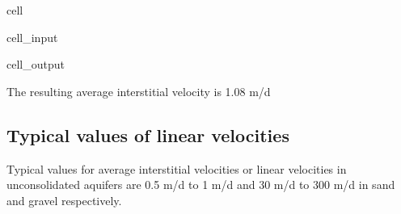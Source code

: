 \documentclass[letterpaper,10pt,english]{jupyterBook}
\begin{document}
\begin{sphinxuseclass}{cell}\begin{sphinxVerbatimInput}

\begin{sphinxuseclass}{cell_input}
\begin{sphinxVerbatim}[commandchars=\\\{\}]
   
   
   


       
\end{sphinxVerbatim}

\end{sphinxuseclass}\end{sphinxVerbatimInput}
\begin{sphinxVerbatimOutput}

\begin{sphinxuseclass}{cell_output}
\begin{sphinxVerbatim}[commandchars=\\\{\}]
The resulting average interstitial velocity is 1.08 m/d
\end{sphinxVerbatim}

\end{sphinxuseclass}\end{sphinxVerbatimOutput}

\end{sphinxuseclass}

\subsection{Typical values of linear velocities}
\label{\detokenize{content/flow/L4/14_darcy_law_K:typical-values-of-linear-velocities}}
\sphinxAtStartPar
Typical values for average interstitial velocities or linear velocities in unconsolidated aquifers are 0.5 m/d to 1 m/d and 30
m/d to 300 m/d in sand and gravel respectively.
\end{document}
